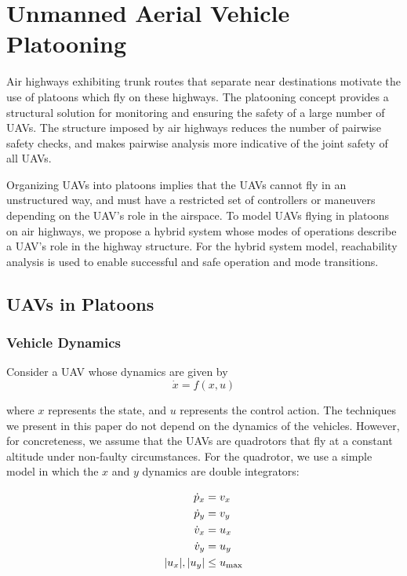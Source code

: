 \section{Unmanned Aerial Vehicle Platooning \label{sec:platooning}}
Air highways exhibiting trunk routes that separate near destinations motivate the use of platoons which fly on these highways. The platooning concept provides a structural solution for monitoring and ensuring the safety of a large number of UAVs. The structure imposed by air highways reduces the number of pairwise safety checks, and makes pairwise analysis more indicative of the joint safety of all UAVs.

Organizing UAVs into platoons implies that the UAVs cannot fly in an unstructured way, and must have a restricted set of controllers or maneuvers depending on the UAV's role in the airspace. To model UAVs flying in platoons on air highways, we propose a hybrid system whose modes of operations describe a UAV's role in the highway structure. For the hybrid system model, reachability analysis is used to enable successful and safe operation and mode transitions.

\subsection{UAVs in Platoons}
\subsubsection{Vehicle Dynamics}
Consider a UAV whose dynamics are given by
\begin{equation}
\label{eq:veh_dyn}
\dot{x} = f(x,u)
\end{equation}

\noindent where $x$ represents the state, and $u$ represents the control action. The techniques we present in this paper do not depend on the dynamics of the vehicles. However, for concreteness, we assume that the UAVs are quadrotors that fly at a constant altitude under non-faulty circumstances. For the quadrotor, we use a simple model in which the $x$ and $y$ dynamics are double integrators:

\begin{equation} \label{eq:dyn}
\begin{aligned}
\dot{p}_x &= v_x \\
\dot{p}_y &= v_y  \\
\dot{v}_x &= u_x \\
\dot{v}_y &= u_y \\
|u_x|,|u_y| &\le u_\text{max}
\end{aligned}
\end{equation}

